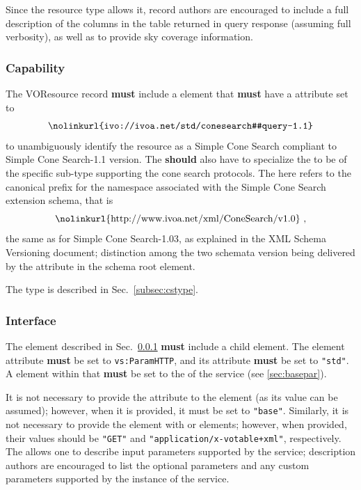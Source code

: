 \documentclass[11pt,a4paper]{ivoa} 
\begin{document}
Since the  resource type allows it, record
authors are encouraged to include a full description of the columns in
the table returned in query response (assuming full verbosity), as well
as to provide sky coverage information.

\subsubsection{Capability} \label{subsec:capability} The VOResource
record \textbf{must} include a  element that
\textbf{must} have a  attribute set to
$$\hbox{\nolinkurl{ivo://ivoa.net/std/conesearch#query-1.1}}$$ to
unambiguously identify the resource as a Simple Cone Search compliant to
Simple Cone Search-1.1 version. The  \textbf{should}
also have  to specialize the
 to be of the specific sub-type supporting the cone
search protocols. The  here refers to the canonical prefix
for the namespace associated with the Simple Cone Search extension
schema, that is
$$\hbox{\nolinkurl{http://www.ivoa.net/xml/ConeSearch/v1.0} ,}$$ the
same as for Simple Cone Search-1.03, as explained in the XML Schema
Versioning \citep{note:schemaversioning} document; distinction among the
two schemata version being delivered by the  attribute in
the schema root element.

The  type is described in Sec.~\ref{subsec:cstype}.

\subsubsection{Interface} The  element described in
Sec.~\ref{subsec:capability} \textbf{must} include a child
 element.  The  element
 attribute \textbf{must} be set to
\texttt{vs:ParamHTTP}, and its  attribute \textbf{must} be
set to \texttt{"std"}. A  element within that
 \textbf{must} be set to the  of the
service (see \ref{sec:basepar}). 

It is not necessary to provide the  attribute to the
 element (as its value can be assumed); however, when
it is provided, it must be set to \texttt{"base"}. Similarly, it is not
necessary to provide the  element with
 or  elements; however, when
provided, their values should be \texttt{"GET"} and
\texttt{"application/x-votable+xml"}, respectively. The
 allows one to describe input parameters supported
by the service; description authors are encouraged to list the optional
parameters and any custom parameters supported by the instance of the
service.  
\end{document}
